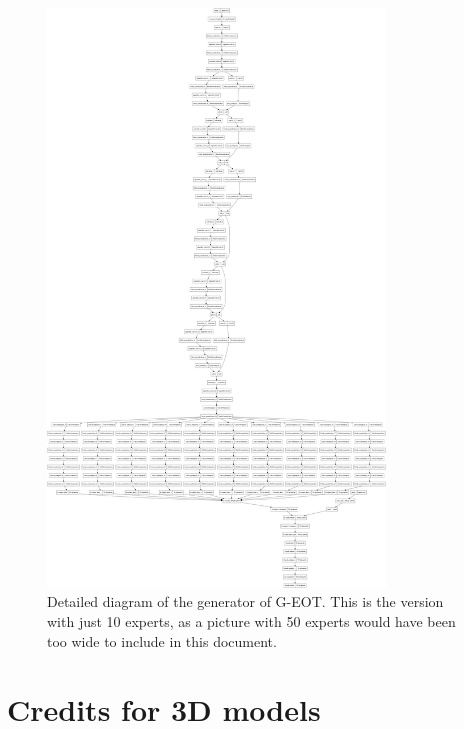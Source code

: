 \begin{figure}[h]
    \centering
    \includegraphics[width=0.8\textwidth]{graphics/detailed_generator.png}
    \caption[Detailed diagram of the generator of G-EOT.]{Detailed diagram of the generator of G-EOT. This is the version with just 10 experts, as a picture with 50 experts would have been too wide to include in this document.}
\end{figure}

\chapter{Credits for 3D models}
    \label{app:model_credits}

